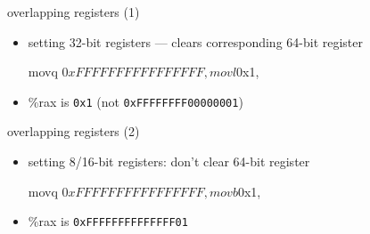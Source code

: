 

\begin{frame}[fragile,label=overlapEx]{overlapping registers (1)}
    \begin{itemize}
    \item setting 32-bit registers --- clears corresponding 64-bit register
\begin{asmcodeNL}
movq $0xFFFFFFFFFFFFFFFF, %
movl $0x1, %
\end{asmcodeNL}
        \item \%rax is {\tt 0x1} ({\small not {\tt 0xFFFFFFFF00000001}})
    \end{itemize}
\end{frame}
\begin{frame}[fragile,label=overlapEx2]{overlapping registers (2)}
\begin{itemize}
    \item setting 8/16-bit registers: don't clear 64-bit register
\begin{asmcodeNL}
movq $0xFFFFFFFFFFFFFFFF, %
movb $0x1, %
\end{asmcodeNL}
    \item \%rax is {\tt 0xFFFFFFFFFFFFFF01}
\end{itemize}
\end{frame}

